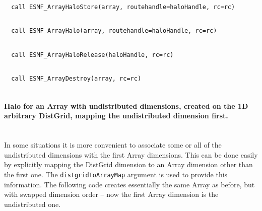  \begin{verbatim}
  call ESMF_ArrayHaloStore(array, routehandle=haloHandle, rc=rc)
 
\end{verbatim}
 

 \begin{verbatim}
  call ESMF_ArrayHalo(array, routehandle=haloHandle, rc=rc)
 
\end{verbatim}
 

 \begin{verbatim}
  call ESMF_ArrayHaloRelease(haloHandle, rc=rc)
 
\end{verbatim}
 

 \begin{verbatim}
  call ESMF_ArrayDestroy(array, rc=rc)
 
\end{verbatim}
 

   \paragraph{Halo for an Array with undistributed dimensions, created on
   the 1D arbitrary DistGrid, mapping the undistributed dimension first.}
   \mbox{} \\
  
   In some situations it is more convenient to associate some or all of
   the undistributed dimensions with the first Array dimensions. This can be
   done easily by explicitly mapping the DistGrid dimension to an Array dimension
   other than the first one. The {\tt distgridToArrayMap} argument is used to
   provide this information. The following code creates essentially the same
   Array as before, but with swapped dimension order -- now the first Array
   dimension is the undistributed one. 

